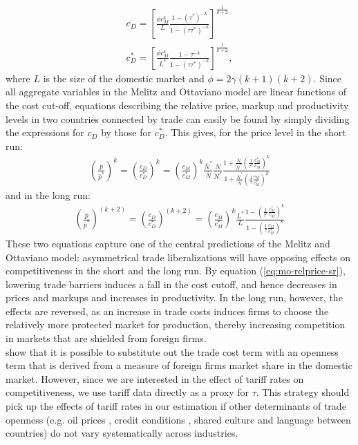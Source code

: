 \begin{align}
c_D = \left[ \frac{\phi c_M^k}{L} \frac{1-(\tau^*)^{-k}}{1-(\tau\tau^{*})^{-k}} \right]^{\frac{1}{k+2}} \\
c_D^* = \left[ \frac{\phi c_M^k}{L^*} \frac{1-\tau^{-k}}{1-(\tau\tau^{*})^{-k}} \right]^{\frac{1}{k+2}},
\end{align}
where $L$ is the size of the domestic market and $\phi=2\gamma(k+1)(k+2)$. Since all aggregate variables in the Melitz and Ottaviano model are linear functions of the cost cut-off, equations describing the relative price, markup and productivity levels in two countries connected by trade can easily be found by simply dividing the expressions for $c_D$ by those for $c_D^*$. This gives, for the price level in the short run:
\begin{align}
\left( \frac{\bar{p}}{\bar{p}^*} \right)^k = \left( \frac{c_D}{c_D^*} \right)^k = \left(\frac{c_M}{c_M^*} \right)^k \frac{\bar{N}^*}{\bar{N}} \frac{N}{N^*} \frac{1 + \frac{\bar{N}}{\bar{N}^*} \left(\frac{1}{\tau^*} \frac{c_M^*}{c_M} \right)^k}{1 + \frac{\bar{N}^*}{\bar{N}} \left(\frac{1}{\tau} \frac{c_M}{c_M^*} \right)^k} \label{eq:mo-relprice-sr}
\end{align}
and in the long run: 
\begin{align}
\left( \frac{\bar{p}}{\bar{p}^*} \right)^{(k+2)} = \left( \frac{c_D}{c_D^*} \right)^{(k+2)} = \left( \frac{c_M}{c_M^*} \right)^k \frac{L^*}{L} \frac{1- \left(\frac{1}{\tau^*} \frac{c_M^*}{c_M}\right)^k}{1 - \left(\frac{1}{\tau}\frac{c_M}{c_M^*}\right)^k} \label{eq:mo-relprice-lr}
\end{align}
These two equations capture one of the central predictions of the Melitz and Ottaviano model: asymmetrical trade liberalizations will have opposing effects on competitiveness in the short and the long run. By equation (\ref{eq:mo-relprice-sr}), lowering trade barriers induces a fall in the cost cutoff, and hence decreases in prices and markups and increases in productivity. In the long run, however, the effects are reversed, as an increase in trade costs induces firms to choose the relatively more protected market for production, thereby increasing competition in markets that are shielded from foreign firms. \\
\citet{Chen2009} show that it is possible to substitute out the trade cost term with an openness term that is derived from a measure of foreign firms market share in the domestic market. However, since we are interested in the effect of tariff rates on competitiveness, we use tariff data directly as a proxy for $\tau$. This strategy should pick up the effects of tariff rates in our estimation if other determinants of trade openness (e.g. oil prices \citep{Kilian2009}, credit conditions \citep{Chor2012}, shared culture and language between countries) do not vary systematically across industries. \\
